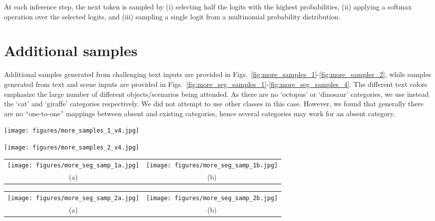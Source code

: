 \documentclass[final]{cvpr}
\begin{document}
At each inference step, the next token is sampled by (i) selecting half the logits with the highest probabilities, (ii) applying a softmax operation over the selected logits, and (iii) sampling a single logit from a multinomial probability distribution.


\section{Additional samples}
Additional samples generated from challenging text inputs are provided in Figs.~\ref{fig:more_samples_1}-\ref{fig:more_samples_2}, while samples generated from text and scene inputs are provided in Figs.~\ref{fig:more_seg_samples_1}-\ref{fig:more_seg_samples_4}. The different text colors emphasize the large number of different objects/scenarios being attended. As there are no `octopus' or `dinosaur' categories, we use instead the `cat' and `giraffe' categories respectively. We did not attempt to use other classes in this case. However, we found that generally there are no ``one-to-one'' mappings between absent and existing categories, hence several categories may work for an absent category.

\begin{figure*}[t]
    \centering
    \texttt{[image: figures/more\_samples\_1\_v4.jpg]}
    \caption{Additional samples generated from challenging text inputs.}
    \label{fig:more_samples_1}
\end{figure*}


\begin{figure*}[t]
    \centering
    \texttt{[image: figures/more\_samples\_2\_v4.jpg]}
    \caption{Additional samples generated from challenging text inputs.}
    \label{fig:more_samples_2}
\end{figure*}

\begin{figure*}[t]
    \centering
    \begin{tabular}{cc}
    \texttt{[image: figures/more\_seg\_samp\_1a.jpg]} & \texttt{[image: figures/more\_seg\_samp\_1b.jpg]} \\
        (a) & (b) 
    \end{tabular}
    \caption{Additional samples generated (b) from text and segmentation inputs (a).}
    \label{fig:more_seg_samples_1}
\end{figure*}

\begin{figure*}[t]
    \centering
    \begin{tabular}{cc}
    \texttt{[image: figures/more\_seg\_samp\_2a.jpg]} & \texttt{[image: figures/more\_seg\_samp\_2b.jpg]} \\
        (a) & (b) 
    \end{tabular}
    \caption{Additional samples generated (b) from text and segmentation inputs (a).}
    \label{fig:more_seg_samples_2}
\end{figure*}
\end{document}
